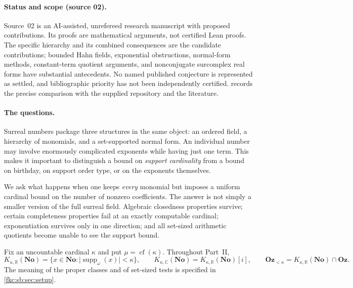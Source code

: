 \documentclass[11pt,letterpaper]{article}
\numberwithin{equation}{section}
\theoremstyle{definition}
\theoremstyle{remark}
\newcommand{\R}{\mathbb R}
\newcommand{\C}{\mathbb C}
\newcommand{\No}{\mathbf{No}}
\newcommand{\cf}{\operatorname{cf}}
\newcommand{\Oz}{\mathbf{Oz}}
\newcommand{\suppw}{\operatorname{supp}_{\omega}}
\newcommand{\card}[1]{\lvert #1\rvert}
\newcommand{\KN}[2]{K_{#1,#2}(\No)}%
\newcommand{\Ok}{\Oz_{<\kappa}}
\begin{document}
\paragraph{Status and scope (source 02).}
Source~02 is an AI-assisted, unrefereed research manuscript with proposed contributions. Its proofs are mathematical arguments, not certified Lean proofs. The specific hierarchy and its combined consequences are the candidate contributions; bounded Hahn fields, exponential obstructions, normal-form methods, constant-term quotient arguments, and nonconjugate surcomplex real forms have substantial antecedents. No named published conjecture is represented as settled, and bibliographic priority has not been independently certified.  records the precise comparison with the supplied repository and the literature.

\paragraph{The questions.}
Surreal numbers package three structures in the same object: an ordered field, a hierarchy of monomials, and a set-supported normal form. An individual number may involve enormously complicated exponents while having just one term. This makes it important to distinguish a bound on \emph{support cardinality} from a bound on birthday, on support order type, or on the exponents themselves.

We ask what happens when one keeps \emph{every} monomial but imposes a uniform cardinal bound on the number of nonzero coefficients. The answer is not simply a smaller version of the full surreal field. Algebraic closedness properties survive; certain completeness properties fail at an exactly computable cardinal; exponentiation survives only in one direction; and all set-sized arithmetic quotients become unable to see the support bound.

Fix an uncountable cardinal $\kappa$ and put $\mu=\cf(\kappa)$. Throughout Part~II,
\begin{equation}\label{fkc:sb:eq:family}
 \KN\kappa\R=\{x\in\No:\card{\suppw(x)}<\kappa\},\qquad
 \KN\kappa\C=\KN\kappa\R[i],\qquad \Ok=\KN\kappa\R\cap\Oz.
\end{equation}
The meaning of the proper classes and of set-sized tests is specified in \cref{fkc:sb:sec:setup}.
\end{document}
